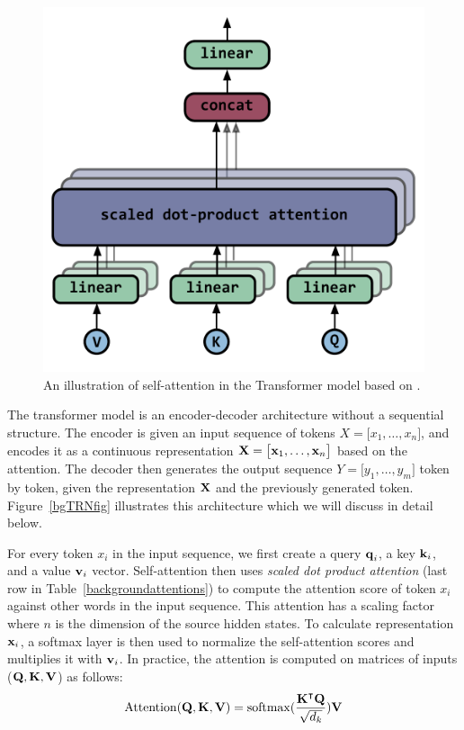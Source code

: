 \begin{figure}
\centering
\includegraphics[width=0.5\linewidth]{02-background/figs/selfatt.pdf}
\caption{An illustration of self-attention in the Transformer model based on \citet{vaswani2017attention}.}
\label{bgTRNattfig}
\end{figure}


The transformer model is an encoder-decoder architecture without a sequential structure.
The encoder is given an input sequence of tokens $X = \big[ x_1, \ldots, x_n \big] $, and encodes it as a continuous representation $\bm{\mathbf{X}} = \big[\bm{\mathbf{x}}_1, \ldots, \bm{\mathbf{x}}_n \big] $ based on the attention. 
The decoder then generates the output sequence $Y = \big[ y_1, \ldots, y_m \big] $ token by token, given the representation $\bm{\mathbf{X}}$ and the previously generated token. 
Figure~\ref{bgTRNfig} illustrates this architecture which we will discuss in detail below. 

For every token $x_i$ in the input sequence, we first create a query $\bm{\mathbf{q}}_i$, a key $\bm{\mathbf{k}}_i$, and a value $\bm{\mathbf{v}}_i$ vector.
Self-attention then uses \textit{scaled dot product attention} (last row in Table~\ref{backgroundattentions}) to compute the attention score of token $x_i$ against other words in the input sequence.
This attention has a scaling factor where $n$ is the dimension of the source hidden states.
To calculate representation $\bm{\mathbf{x}}_i$, a softmax layer is then used to normalize the self-attention scores and multiplies it with $\bm{\mathbf{v}}_i$.
In practice, the attention is computed on matrices of inputs ($\bm{\mathbf{Q}}, \bm{\mathbf{K}}, \bm{\mathbf{V}}$) as follows:
\begin{align}
\operatorname*{Attention} (\bm{\mathbf{Q}}, \bm{\mathbf{K}}, \bm{\mathbf{V}}) = \operatorname*{softmax} (\frac{\bm{\mathbf{K}}^\intercal \bm{\mathbf{Q}} }{\sqrt{d_k}})\bm{\mathbf{V}}
\end{align}

